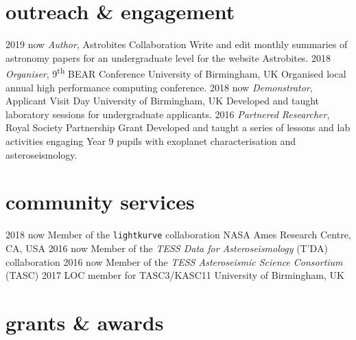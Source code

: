 \documentclass[]{k-cv} %
\begin{document}
\section{outreach \& engagement}

\begin{entrylist}
\entry
{2019 \to now}
{\emph{Author}, Astrobites Collaboration}
{}
{Write and edit monthly summaries of astronomy papers for an undergraduate level for the website Astrobites.}
\entry
{2018 }
{\emph{Organiser}, 9\textsuperscript{th} BEAR Conference}
{University of Birmingham, UK}
{Organised local annual high performance computing conference.}
\entry
{2018 \to now}
{\emph{Demonstrator}, Applicant Visit Day}
{University of Birmingham, UK}
{Developed and taught laboratory sessions for undergraduate applicants.}
\entry
{2016 }
{\emph{Partnered Researcher}, Royal Society Partnership Grant}
{}
{Developed and taught a series of lessons and lab activities engaging Year 9 pupils with exoplanet characterisation and asteroseismology.}
\end{entrylist}

\clearpage
{}

\section{community services}
\begin{entrylist}
\entrythree
{2018 \to now}
{Member of the \texttt{lightkurve} collaboration}
{NASA Ames Research Centre, CA, USA}
\entrythree
{2016 \to now}
{Member of the \emph{TESS Data for Asteroseismology} (T'DA) collaboration }
{}
\entrythree
{2016 \to now}
{Member of the \emph{TESS Asteroseismic Science Consortium} (TASC)}
{}
\entrythree
{2017}
{LOC member for TASC3/KASC11}
{University of Birmingham, UK}
\end{entrylist}



\section{grants \& awards}
\end{document}

